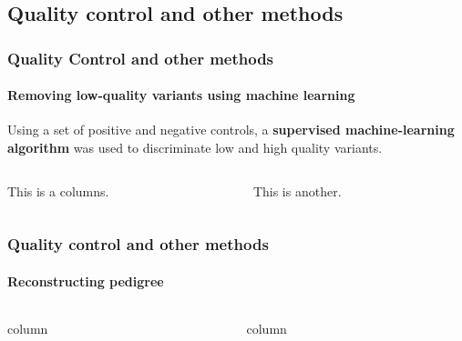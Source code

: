 \subsection{Quality control and other methods}
\begin{frame}
    \frametitle{Quality Control and other methods}
    \framesubtitle{Removing low-quality variants using machine learning}

    \begin{center}
        Using a set of \textcolor{complement-2}{positive} and \textcolor{complement-1}{negative} controls, a \textbf{supervised machine-learning algorithm} was used to discriminate low and high quality variants.
    \end{center}

    \begin{columns}
        \begin{column}{0.5\textwidth}
            This is a columns.
        \end{column}
        \begin{column}{0.5\textwidth}
            This is another.
        \end{column}
    \end{columns}
\end{frame}


\begin{frame}
    \frametitle{Quality control and other methods}
    \framesubtitle{Reconstructing pedigree}
    \begin{columns}
        \begin{column}{0.5\textwidth}
            column
        \end{column}
        \begin{column}{0.5\textwidth}
            column
        \end{column}
    \end{columns}

\end{frame}

